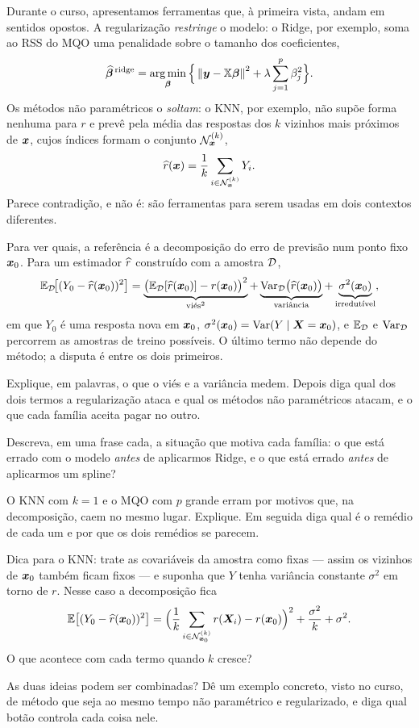 Durante o curso, apresentamos ferramentas que, à primeira vista, andam em sentidos
opostos. A regularização \emph{restringe} o modelo: o Ridge, por exemplo, soma ao
RSS do MQO uma penalidade sobre o tamanho dos coeficientes,
\[
  \widehat{\bbeta}^{\,\text{ridge}}
   = \argmin_{\bbeta}\Big\{\norm{\bm y-\mathbb{X}\bbeta}^2+\lambda\sum_{j=1}^{p}\beta_j^2\Big\}.
\]
Os métodos não paramétricos o \emph{soltam}: o KNN, por exemplo, não supõe forma
nenhuma para $r$ e prevê pela média das respostas dos $k$ vizinhos mais próximos de
$\bm{x}$, cujos índices formam o conjunto $\mathcal{N}_{\bm{x}}^{(k)}$,
\[
  \widehat{r}(\bm{x})=\frac1k\sum_{i\in\mathcal{N}_{\bm{x}}^{(k)}} Y_i .
\]
Parece contradição, e não é: são ferramentas para serem usadas em dois contextos
diferentes.

Para ver quais, a referência é a decomposição do erro de previsão num ponto fixo
$\bm{x}_0$. Para um estimador $\widehat{r}$ construído com a amostra $\mathcal{D}$,
\[
  \mathbb{E}_{\mathcal{D}}\!\big[(Y_0-\widehat{r}(\bm{x}_0))^2\big]
  = \underbrace{\big(\mathbb{E}_{\mathcal{D}}[\widehat{r}(\bm{x}_0)]-r(\bm{x}_0)\big)^2}_{\text{viés}^2}
  + \underbrace{\operatorname{Var}_{\mathcal{D}}\!\big(\widehat{r}(\bm{x}_0)\big)}_{\text{variância}}
  + \underbrace{\sigma^2(\bm{x}_0)}_{\text{irredutível}},
\]
em que $Y_0$ é uma resposta nova em $\bm{x}_0$, $\sigma^2(\bm{x}_0)=\operatorname{Var}(Y\mid\bm{X}=\bm{x}_0)$, e
$\mathbb{E}_{\mathcal{D}}$ e $\operatorname{Var}_{\mathcal{D}}$ percorrem as amostras de treino possíveis. O último
termo não depende do método; a disputa é entre os dois primeiros.

\begin{itens}
  \item {} Explique, em palavras, o que o viés e a variância medem. Depois
        diga qual dos dois termos a regularização ataca e qual os métodos não
        paramétricos atacam, e o que cada família aceita pagar no outro.
  \item {} Descreva, em uma frase cada, a situação que motiva cada família:
        o que está errado com o modelo \emph{antes} de aplicarmos Ridge, e o que
        está errado \emph{antes} de aplicarmos um spline?
  \item {} O KNN com $k=1$ e o MQO com $p$ grande erram por motivos que,
        na decomposição, caem no mesmo lugar. Explique. Em seguida diga qual é o
        remédio de cada um e por que os dois remédios se parecem.

        Dica para o KNN: trate as covariáveis da amostra como fixas --- assim os
        vizinhos de $\bm{x}_0$ também ficam fixos --- e suponha que $Y$ tenha variância
        constante $\sigma^2$ em torno de $r$. Nesse caso a decomposição fica
        \[
          \mathbb{E}\big[(Y_0-\widehat{r}(\bm{x}_0))^2\big]
          = \Big(\frac1k\sum_{i\in\mathcal{N}_{\bm{x}_0}^{(k)}} r(\bm{X}_i)-r(\bm{x}_0)\Big)^2
          + \frac{\sigma^2}{k} + \sigma^2 .
        \]
        O que acontece com cada termo quando $k$ cresce?
  \item {} As duas ideias podem ser combinadas? Dê um exemplo concreto,
        visto no curso, de método que seja ao mesmo tempo não paramétrico e
        regularizado, e diga qual botão controla cada coisa nele.
\end{itens}

